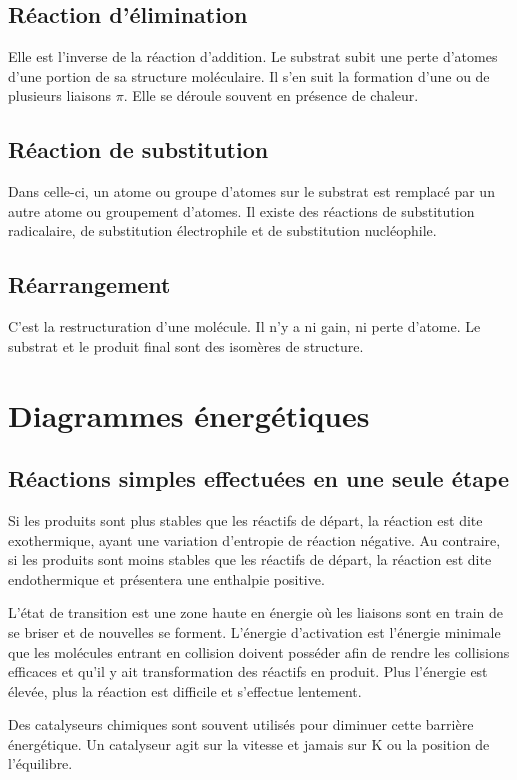 \subsection{Réaction d'élimination}
Elle est l'inverse de la réaction d'addition.
Le substrat subit une perte d'atomes d'une portion de sa structure moléculaire.
Il s'en suit la formation d'une ou de plusieurs liaisons $\pi$.
Elle se déroule souvent en présence de chaleur.

\subsection{Réaction de substitution}
Dans celle-ci, un atome ou groupe d'atomes sur le substrat est remplacé par un autre atome ou groupement d'atomes.
Il existe des réactions de substitution radicalaire, de substitution électrophile et de substitution nucléophile.

\subsection{Réarrangement}
C'est la restructuration d'une molécule.
Il n'y a ni gain, ni perte d'atome.
Le substrat et le produit final sont des isomères de structure.

\section{Diagrammes énergétiques}

\subsection{Réactions simples effectuées en une seule étape} Si les produits sont plus stables que les réactifs de départ, la réaction est dite exothermique, ayant une variation d'entropie de réaction négative.
Au contraire, si les produits sont moins stables que les réactifs de départ, la réaction est dite endothermique et présentera une enthalpie positive.

L'état de transition est une zone haute en énergie où les liaisons sont en train de se briser et de nouvelles se forment.
L'énergie d'activation est l'énergie minimale que les molécules entrant en collision doivent posséder afin de rendre les collisions efficaces et qu'il y ait transformation des réactifs en produit.
Plus l'énergie est élevée, plus la réaction est difficile et s'effectue lentement.

Des catalyseurs chimiques sont souvent utilisés pour diminuer cette barrière énergétique.
Un catalyseur agit sur la vitesse et jamais sur K ou la position de l'équilibre.

